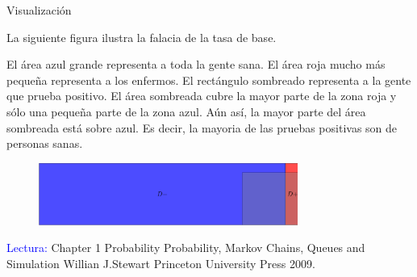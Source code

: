 \documentclass[10pt]{beamer}
\begin{document}
\begin{frame}{Visualizaci\'on}
\small{La siguiente figura ilustra la falacia de la tasa de base. 
	
El \'area azul grande representa a toda la gente sana. El \'area roja mucho m\'as peque\~na representa a los enfermos. El rect\'angulo sombreado representa a la gente que prueba positivo. El \'area sombreada cubre la mayor parte de la zona roja y s\'olo una peque\~na parte de la zona azul. A\'un as\'i, la mayor parte del \'area sombreada est\'a sobre azul. Es decir, la mayoria de las pruebas positivas son de personas sanas.
	
\begin{figure}[h]
	\centering
	\includegraphics[width=8.5cm]{g10}
\end{figure}
}	

\scriptsize{\textcolor{blue}{Lectura:} Chapter 1 Probability Probability, Markov Chains, Queues and Simulation Willian J.Stewart Princeton University Press 2009.}
\end{frame}
\end{document}
